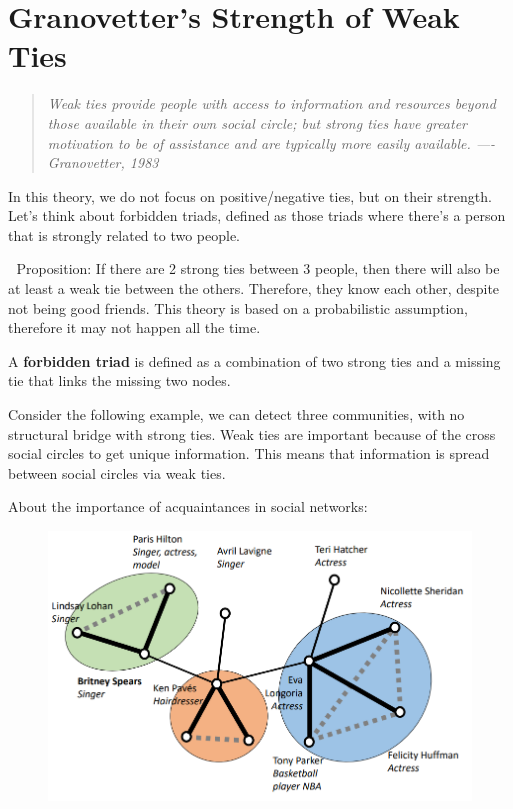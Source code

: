 \documentclass[
  notitlepage,
  onecolumn,
  openany]{book}
\begin{document}
\hypertarget{granovetters-strength-of-weak-ties}{%
\section{Granovetter's Strength of Weak Ties}\label{granovetters-strength-of-weak-ties}}

\begin{quote}
\emph{Weak ties provide people with access to information and resources
beyond those available in their own social circle; but strong ties have
greater motivation to be of assistance and are typically more easily
available.
---- Granovetter, 1983}
\end{quote}

In this theory, we do not focus on positive/negative ties, but on their strength. Let's think about forbidden triads, defined as those triads where there's a person that is strongly related to two people.

💁️ Proposition: If there are 2 strong ties between 3 people, then there will also be at least a weak tie between the others. Therefore, they know each other, despite not being good friends. This theory is based on a probabilistic assumption, therefore it may not happen all the time.

A \textbf{forbidden triad} is defined as a combination of two strong ties and a missing tie that links the missing two nodes.

Consider the following example, we can detect three communities, with no structural bridge with strong ties. Weak ties are important because of the cross social circles to get unique information. This means that information is spread between social circles via weak ties.

About the importance of acquaintances in social networks:

\begin{figure}[h!]

{\centering \includegraphics[width=0.5\linewidth]{images/07-Triads and structural holes/Untitled 1} 

}

\end{figure}
\end{document}
